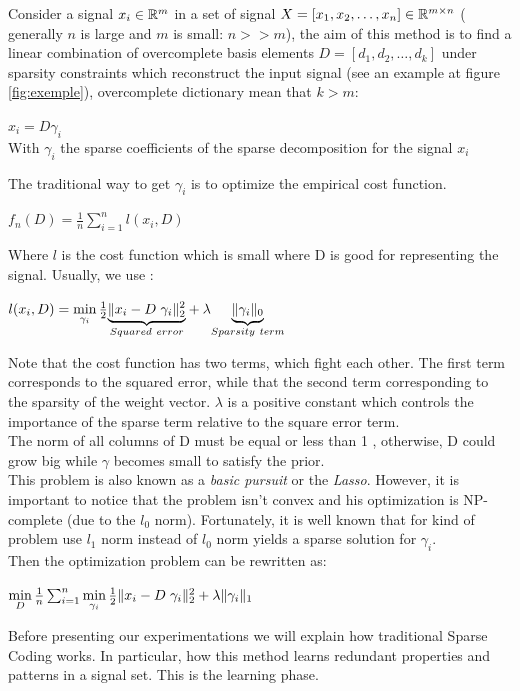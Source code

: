 Consider a signal $x_i \in \mathbb{R}^m$ in a set of signal $X = [x_1, x_2, \ldots, x_n] \in \mathbb{R}^{m \times n}$ ( generally $n$ is large and $m$ is small: $n >> m$), the aim of this method is to find a linear combination of overcomplete basis elements $D = [d_1, d_2, \ldots, d_k]$ under sparsity constraints which reconstruct the input signal (see  an example at figure \ref{fig:exemple}), overcomplete dictionary mean that $k > m$:
\begin{center}
 $x_i = D \gamma_i$
 \\ With $\gamma_i$ the sparse coefficients of the sparse decomposition for the signal $x_i$
\end{center}

The traditional way to get $\gamma_i$ is to optimize the empirical cost function.
\begin{center}
 $f_n(D) = \frac{1}{n} \sum_{i=1}^{n} l (x_i,D)$
\end{center}
Where $l$ is the cost function which is small where D is good for representing the signal. Usually, we use :
\begin{center}
 $l(x_i,D) =   \min\limits_{\gamma_i} \frac{1}{2} \underset{Squared\ error}{\underbrace{\| x_i - D \hspace{3px} \gamma_i \|_2^2}} + \lambda \underset{Sparsity\ term}{\underbrace{ \|\gamma_i \|_0}}$
\end{center}
Note that the cost function has two terms, which fight each other.  The first term corresponds to the squared error, while that the second term corresponding to the sparsity of the weight vector. $\lambda$ is a positive constant which controls the importance of the sparse term relative to the square error term. \\
The norm of all columns of D must be equal or less than 1  , otherwise, D could grow big while $\gamma$ becomes small to satisfy the prior.\\
This problem is also known as a \textit{basic pursuit}  or the  \textit{Lasso}. However, it is important to notice that the problem isn't convex and his optimization is NP-complete (due to the $l_0$ norm). Fortunately, it is well known that for kind of problem use $l_1$ norm instead of $l_0$ norm yields a sparse solution for $\gamma_i$.\\
Then the optimization problem can be rewritten as:
\begin{center}
 $\min\limits_{D} \frac{1}{n} \sum_{i=1}^{n}  \min\limits_{\gamma_i} \frac{1}{2} \| x_i - D \hspace{3px} \gamma_i \|_2^2 + \lambda \|\gamma_i \|_1$
\end{center}
Before presenting our experimentations we will explain how traditional Sparse Coding works. In particular, how this method learns redundant properties and patterns in a signal set. This is the learning phase.
\newpage
